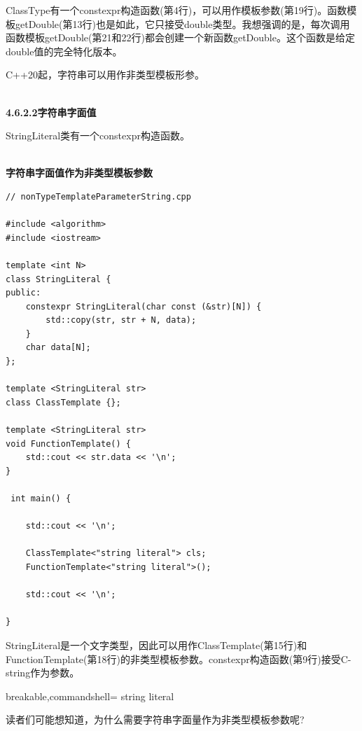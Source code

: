 ClassType有一个constexpr构造函数(第4行)，可以用作模板参数(第19行)。函数模板getDouble(第13行)也是如此，它只接受double类型。我想强调的是，每次调用函数模板getDouble(第21和22行)都会创建一个新函数getDouble。这个函数是给定double值的完全特化版本。

C++20起，字符串可以用作非类型模板形参。

\hspace*{\fill} \\ %
\noindent
\textbf{4.6.2.2\hspace{0.2cm}字符串字面值}

StringLiteral类有一个constexpr构造函数。

\hspace*{\fill} \\ %
\noindent
\textbf{字符串字面值作为非类型模板参数}
\begin{lstlisting}[style=styleCXX]
// nonTypeTemplateParameterString.cpp

#include <algorithm>
#include <iostream>

template <int N>
class StringLiteral {
public:
	constexpr StringLiteral(char const (&str)[N]) {
		std::copy(str, str + N, data);
	}
	char data[N];
};

template <StringLiteral str>
class ClassTemplate {};

template <StringLiteral str>
void FunctionTemplate() {
	std::cout << str.data << '\n';
}

 int main() {
	
	std::cout << '\n';
	
	ClassTemplate<"string literal"> cls;
	FunctionTemplate<"string literal">();
	
	std::cout << '\n';

}
\end{lstlisting}

StringLiteral是一个文字类型，因此可以用作ClassTemplate(第15行)和FunctionTemplate(第18行)的非类型模板参数。constexpr构造函数(第9行)接受C-string作为参数。

\begin{tcblisting}{breakable,commandshell={}}
string literal
\end{tcblisting}

读者们可能想知道，为什么需要字符串字面量作为非类型模板参数呢?

